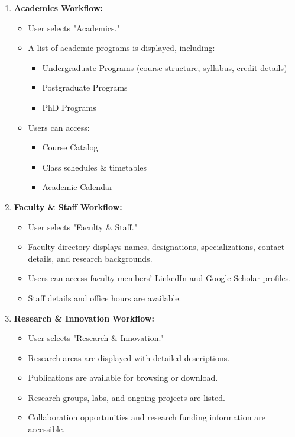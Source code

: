 \documentclass[11pt]{article}
\begin{document}
\begin{enumerate}
    \item \textbf{Academics}
    \textbf{Workflow:}
    \begin{itemize}
        \item User selects "Academics."
        \item A list of academic programs is displayed, including:
        \begin{itemize}
            \item Undergraduate Programs (course structure, syllabus, credit details)
            \item Postgraduate Programs
            \item PhD Programs
        \end{itemize}
        \item Users can access:
        \begin{itemize}
            \item Course Catalog
            \item Class schedules \& timetables
            \item Academic Calendar
        \end{itemize}
    \end{itemize}

    \item \textbf{Faculty \& Staff}
    \textbf{Workflow:}
    \begin{itemize}
        \item User selects "Faculty \& Staff."
        \item Faculty directory displays names, designations, specializations, contact details, and research backgrounds.
        \item Users can access faculty members' LinkedIn and Google Scholar profiles.
        \item Staff details and office hours are available.
    \end{itemize}

    \item \textbf{Research \& Innovation}
    \textbf{Workflow:}
    \begin{itemize}
        \item User selects "Research \& Innovation."
        \item Research areas are displayed with detailed descriptions.
        \item Publications are available for browsing or download.
        \item Research groups, labs, and ongoing projects are listed.
        \item Collaboration opportunities and research funding information are accessible.
    \end{itemize}


\end{enumerate}
\end{document}
